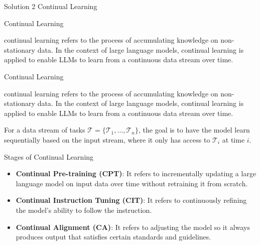 \documentclass[t]{beamer}
\begin{document}
\begin{frame}{Solution 2}
  \vspace{5cm}
  \centering
  Continual Learning 
\end{frame}

\begin{frame}{Continual Learning}
  \vspace{1cm}
  \begin{Definition}
    continual learning refers to the process of accumulating knowledge on non-stationary data. In the context of large language models, continual learning is applied to enable LLMs
to learn from a continuous data stream over time. \cite{Biesi20}
  \end{Definition}
\end{frame}
\begin{frame}{Continual Learning}
  \vspace{1cm}
  \begin{Definition}
    continual learning refers to the process of accumulating knowledge on non-stationary data. In the context of large language models, continual learning is applied to enable LLMs
to learn from a continuous data stream over time. \cite{Biesi20}
  \end{Definition}
  \vspace{1cm}
  \begin{Definition}
    For a data stream of tasks $\mathcal{T}= \{\mathcal{T}_1,\ldots,\mathcal{T}_n \}$, the goal is to
have the model learn sequentially based on the input stream, where it only has access to $\mathcal{T}_i$ at time $i$. \cite{Wu24}
  \end{Definition}
\end{frame}

\begin{frame}{Stages of Continual Learning\cite{Wu24}}
  \vspace{1cm}
  \begin{itemize}
    \item \textbf{Continual Pre-training (CPT)}: It refers to incrementally updating a large language model on input data over time without retraining it from scratch. 
    \newline
    \item \textbf{Continual Instruction Tuning (CIT)}: It refers to continuously refining the model's ability to follow the instruction. 
    \newline
    \item \textbf{Continual Alignment (CA)}: It refers to adjusting the model so it always produces output that satisfies certain standards and guidelines. 
  \end{itemize}
\end{frame}
\end{document}
